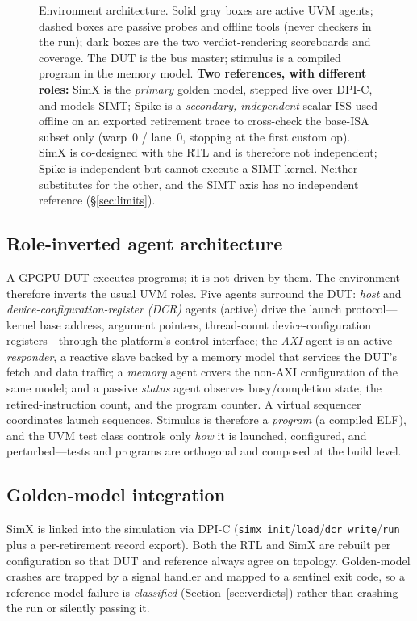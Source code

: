 \documentclass[conference]{IEEEtran}
\newcommand{\code}[1]{\texttt{\small #1}}
\begin{document}
\begin{figure}[t]
\caption{Environment architecture. Solid gray boxes are active UVM
agents; dashed boxes are passive probes and offline tools (never
checkers in the run); dark boxes are the two verdict-rendering
scoreboards and coverage. The DUT is the bus master; stimulus is a
compiled program in the memory model. \textbf{Two references, with
different roles:} SimX is the \emph{primary} golden model, stepped live
over DPI-C, and models SIMT; Spike is a \emph{secondary, independent}
scalar ISS used offline on an exported retirement trace to cross-check
the base-ISA subset only (warp~0 / lane~0, stopping at the first custom
op). SimX is co-designed with the RTL and is therefore not independent;
Spike is independent but cannot execute a SIMT kernel. Neither
substitutes for the other, and the SIMT axis has no independent
reference (\S\ref{sec:limits}).}
\label{fig:arch}
\end{figure}

\subsection{Role-inverted agent architecture}
A GPGPU DUT executes programs; it is not driven by them. The
environment therefore inverts the usual UVM roles. Five agents
surround the DUT: \emph{host} and \emph{device-configuration-register
(DCR)} agents (active) drive the
launch protocol---kernel base address, argument pointers, thread-count
device-configuration registers---through the platform's control
interface; the \emph{AXI} agent is an active \emph{responder}, a
reactive slave backed by a memory model that services the DUT's fetch
and data traffic; a \emph{memory} agent covers the non-AXI
configuration of the same model; and a passive \emph{status} agent
observes busy/completion state, the retired-instruction count, and the
program counter. A virtual sequencer coordinates launch sequences.
Stimulus is therefore a \emph{program} (a compiled ELF), and the UVM
test class controls only \emph{how} it is launched, configured, and
perturbed---tests and programs are orthogonal and composed at the build
level.

\subsection{Golden-model integration}
SimX is linked into the simulation via DPI-C
(\code{simx\_init}/\code{load}/\code{dcr\_write}/\code{run} plus a
per-retirement record export). Both the RTL and SimX are rebuilt per
configuration so that DUT and reference always agree on topology.
Golden-model crashes are trapped by a signal handler and mapped to a
sentinel exit code, so a reference-model failure is \emph{classified}
(Section~\ref{sec:verdicts}) rather than crashing the run or silently
passing it.
\end{document}
